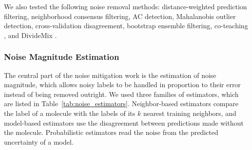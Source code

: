 We also tested the following noise removal methods:  distance-weighted prediction filtering, neighborhood consensus filtering, AC detection, Mahalanobis outlier detection, cross-validation disagreement, bootstrap ensemble filtering, co-teaching \citep{Han2018}, and DivideMix \citep{li2020}.

\subsubsection{Noise Magnitude Estimation}

The central part of the noise mitigation work is the estimation of noise magnitude, which allows noisy labels to be handled in proportion to their error instead of being removed outright. We used three families of estimators, which are listed in Table~\ref{tab:noise_estimators}. Neighbor-based estimators compare the label of a molecule with the labels of its $k$ nearest training neighbors, and model-based estimators use the disagreement between predictions made without the molecule. Probabilistic estimators read the noise from the predicted uncertainty of a model.

